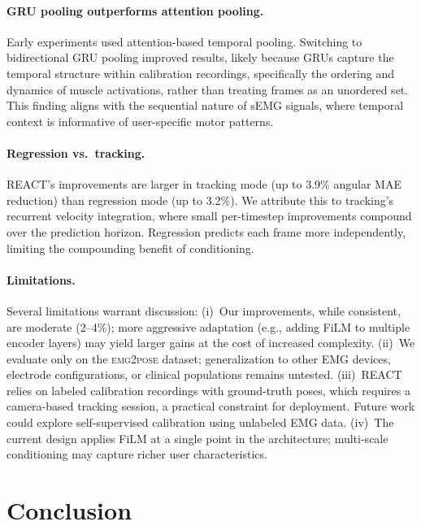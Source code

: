 \documentclass[10pt]{article}
\begin{document}
\paragraph{GRU pooling outperforms attention pooling.}
Early experiments used attention-based temporal pooling. Switching to bidirectional GRU pooling improved results, likely because GRUs capture the temporal structure within calibration recordings, specifically the ordering and dynamics of muscle activations, rather than treating frames as an unordered set. This finding aligns with the sequential nature of sEMG signals, where temporal context is informative of user-specific motor patterns.

\paragraph{Regression vs.\ tracking.}
REACT's improvements are larger in tracking mode (up to 3.9\% angular MAE reduction) than regression mode (up to 3.2\%). We attribute this to tracking's recurrent velocity integration, where small per-timestep improvements compound over the prediction horizon. Regression predicts each frame more independently, limiting the compounding benefit of conditioning.

\paragraph{Limitations.}
Several limitations warrant discussion: (i)~Our improvements, while consistent, are moderate (2--4\%); more aggressive adaptation (e.g., adding FiLM to multiple encoder layers) may yield larger gains at the cost of increased complexity. (ii)~We evaluate only on the \textsc{emg2pose} dataset; generalization to other EMG devices, electrode configurations, or clinical populations remains untested. (iii)~REACT relies on labeled calibration recordings with ground-truth poses, which requires a camera-based tracking session, a practical constraint for deployment. Future work could explore self-supervised calibration using unlabeled EMG data. (iv)~The current design applies FiLM at a single point in the architecture; multi-scale conditioning may capture richer user characteristics.

\section{Conclusion}
\label{sec:conclusion}
\end{document}
